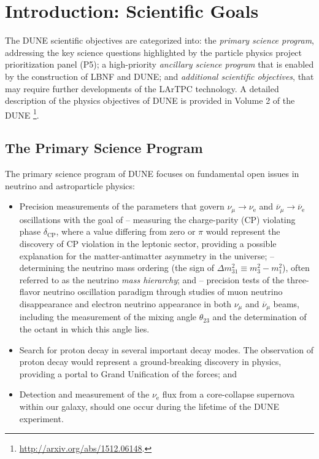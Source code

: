 \section{Introduction: Scientific Goals}
\label{sec:exec-summ-physics-goals}


The DUNE scientific objectives are categorized into: the \textit{primary science program}, addressing the key science questions 
highlighted by the particle physics project prioritization panel (P5); 
a high-priority \textit{ancillary science program} that is 
enabled by the construction of LBNF and DUNE; and \textit{additional scientific objectives}, that may require further developments 
of the LArTPC technology. A detailed description of the physics objectives of DUNE is provided in Volume 2 of the DUNE \footnote{ \url{http://arxiv.org/abs/1512.06148}.}.

\subsection{The Primary Science Program}

The primary science program of DUNE  focuses on fundamental open issues in neutrino and astroparticle physics: 
\begin{itemize}
  \item Precision measurements of the parameters that govern $\nu_{\mu} \rightarrow \nu_\text{e}$ and
           $\overline{\nu}_{\mu} \rightarrow \overline{\nu}_\text{e}$ oscillations with the goal of
  \subitem -- measuring the charge-parity (CP) violating phase $\delta_\text{CP}$, where a value differing from zero or $\pi$ would represent the discovery of CP violation in the leptonic sector, providing a possible explanation for the matter-antimatter asymmetry in the universe;
  \subitem -- determining the neutrino mass ordering (the sign of $\Delta m^2_{31} \equiv m_3^2-m_1^2$), often referred to as the neutrino \textit{mass hierarchy}; and
  \subitem -- precision tests of the three-flavor neutrino oscillation paradigm through studies of muon neutrino disappearance 
    and electron neutrino appearance in both $\nu_\mu$ and $\overline{\nu}_{\mu}$ beams, including the 
    measurement of the mixing angle $\theta_{23}$ and the determination of the octant in which this angle lies.
    \item Search for proton decay in several important decay modes. The observation of proton decay would represent a ground-breaking discovery in physics, providing a portal to Grand Unification of the forces; and
    \item Detection and measurement of the $\nu_\text{e}$ flux from a core-collapse supernova within our galaxy, should one occur during the lifetime of the DUNE experiment.
\end{itemize}

